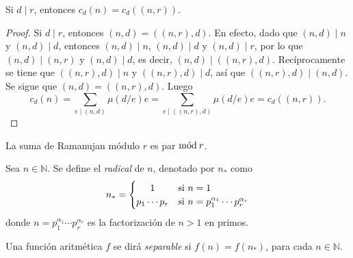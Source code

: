 \begin{lemma}
Si $d \mid r$, entonces $c_d(n)=c_d((n,r))$.
\end{lemma}
\begin{proof}
Si $d \mid r$, entonces $(n,d)=((n,r),d)$. En efecto, dado que $(n,d) \mid n$ y $(n,d) \mid d$, entonces $(n,d) \mid n$, $(n,d) \mid d$ y $(n,d) \mid r$, por lo que $(n,d) \mid (n,r)$ y $(n,d) \mid d$, es decir, $(n,d) \mid ((n,r),d)$. Recíprocamente se tiene que $((n,r),d) \mid n$ y $((n,r),d) \mid d$, así que $((n,r),d) \mid (n,d)$. Se sigue que $(n,d)=((n,r),d)$. Luego
\begin{equation*}
    c_d(n) = \sum_{e \mid (n,d)} \mu(d/e) e = \sum_{e \mid ((n,r),d)} \mu(d/e) e = c_d((n,r)).
\end{equation*}
\end{proof}

\begin{corollary}
La suma de Ramanujan módulo $r$ es par $\mathrm{m\acute{o}d\:}r$.
\end{corollary}

\begin{definition}[Radical]
Sea $n \in \mathbb{N}$. Se define el \emph{radical} de $n$, denotado por $n_*$ como
\begin{equation*}
    n_* = \begin{cases}
        \hfil 1 & \text{si } n=1 \\
        \hfil p_1 \cdots p_r & \text{si } n = p_1^{\alpha_1} \cdots p_r^{\alpha_r}
    \end{cases}
\end{equation*}
donde $n=p_1^{\alpha_1} \cdots p_r^{\alpha_r}$ es la factorización de $n>1$ en primos.
\end{definition}

\begin{definition}
Una función aritmética $f$ se dirá \emph{separable} si $f(n)=f(n_*)$, para cada $n \in \mathbb{N}$.
\end{definition}

